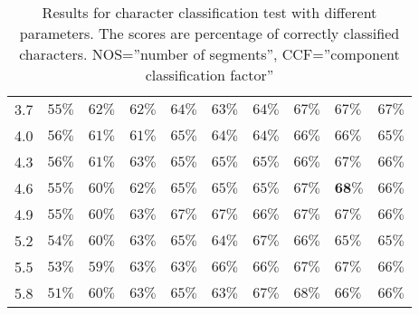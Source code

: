 \begin{table}[htb]
\begin{center}
\begin{tabular}{ c | l l l l l l l l l }
3.7     &  $55\%$  &  $62\%$  &  $62\%$  &  $64\%$  &  $63\%$  &  $64\%$  &  $67\%$  &  $67\%$  &  $67\%$  \\
4.0     &  $56\%$  &  $61\%$  &  $61\%$  &  $65\%$  &  $64\%$  &  $64\%$  &  $66\%$  &  $66\%$  &  $65\%$  \\
4.3     &  $56\%$  &  $61\%$  &  $63\%$  &  $65\%$  &  $65\%$  &  $65\%$  &  $66\%$  &  $67\%$  &  $66\%$  \\
4.6     &  $55\%$  &  $60\%$  &  $62\%$  &  $65\%$  &  $65\%$  &  $65\%$  &  $67\%$  &  $\textbf{68\%}$  &  $66\%$  \\
4.9     &  $55\%$  &  $60\%$  &  $63\%$  &  $67\%$  &  $67\%$  &  $66\%$  &  $67\%$  &  $67\%$  &  $66\%$  \\
5.2     &  $54\%$  &  $60\%$  &  $63\%$  &  $65\%$  &  $64\%$  &  $67\%$  &  $66\%$  &  $65\%$  &  $65\%$  \\
5.5     &  $53\%$  &  $59\%$  &  $63\%$  &  $63\%$  &  $66\%$  &  $66\%$  &  $67\%$  &  $67\%$  &  $66\%$  \\
5.8     &  $51\%$  &  $60\%$  &  $63\%$  &  $65\%$  &  $63\%$  &  $67\%$  &  $68\%$  &  $66\%$  &  $66\%$  \\
  \end{tabular}
\end{center}
\caption{Results for character classification test with different parameters. The scores are percentage of correctly classified characters.
	 NOS=''number of segments'',
         CCF=''component classification factor''}
\label{tab:character_classifier_results_different_parameters} 
\end{table}

